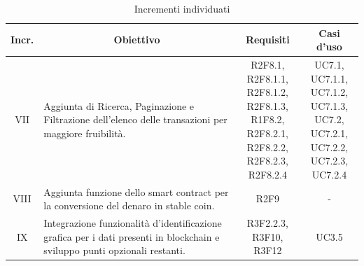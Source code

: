 \begin{table}[H]
  \centering
  \renewcommand{\arraystretch}{1.8}
  \begin{tabular}{c|p{6cm}|c|c}
    \rowcolor[HTML]{125E28}
    \color[HTML]{FFFFFF}\textbf{Incr.}
         & \multicolumn{1}{c}{\color[HTML]{FFFFFF}\textbf{Obiettivo}}
         & \multicolumn{1}{c}{\color[HTML]{FFFFFF}\textbf{Requisiti}}
         & \multicolumn{1}{c}{\color[HTML]{FFFFFF}\textbf{Casi d'uso}}                                                                                                               \\
    \hline
    VII  & Aggiunta di Ricerca, Paginazione e Filtrazione dell'elenco delle transazioni per maggiore fruibilità.                            & \Shortunderstack{R2F8.1, R2F8.1.1,     \\R2F8.1.2, R2F8.1.3,\\R1F8.2, R2F8.2.1,\\R2F8.2.2, R2F8.2.3,\\R2F8.2.4\\} & \Shortunderstack{UC7.1, UC7.1.1,\\UC7.1.2, UC7.1.3,\\UC7.2, UC7.2.1,\\UC7.2.2, UC7.2.3,\\UC7.2.4\\} \\
    VIII & Aggiunta funzione dello smart contract\glo{} per la conversione del denaro in stable coin\glo{}.                                 & R2F9                               & - \\
    IX   & Integrazione funzionalità d'identificazione grafica per i dati presenti in blockchain\glo{} e sviluppo punti opzionali restanti. & \Shortunderstack{R3F2.2.3, R3F10,      \\R3F12\\} & UC3.5 \\
  \end{tabular}
  \caption{Incrementi individuati}
\end{table}
\pagebreak


